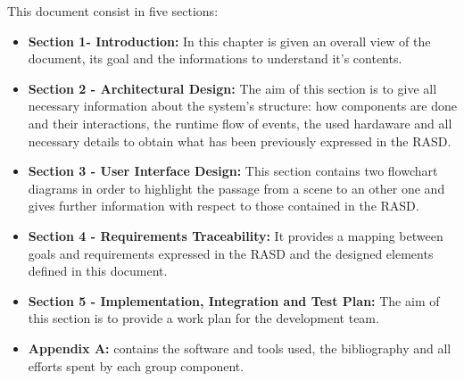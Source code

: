 This document consist in five sections:
\begin{itemize}
	\item \textbf{Section 1- Introduction:} In this chapter is given an overall view of the document, its goal and the informations to understand it's contents.
	\item \textbf{Section 2 - Architectural Design:} The aim of this section is to give all necessary information about the system's 			structure: how components are done and their interactions, the runtime flow of events, the used hardaware and all necessary 		details to obtain what has been previously expressed in the RASD.
	\item \textbf{Section 3 - User Interface Design:} This section contains two flowchart diagrams in order to highlight the passage 		from a scene to an other one and gives further information with respect to those contained in the RASD.
	\item \textbf{Section 4 - Requirements Traceability:} It provides a mapping between goals and requirements expressed in the 			RASD and the designed elements defined in this document.
	\item \textbf{Section 5 - Implementation, Integration and Test Plan:} The aim of this section is to provide a work plan for the development team.
	\item \textbf{Appendix A:} contains the software and tools used, the bibliography and all efforts spent by each group component. 
\end{itemize}